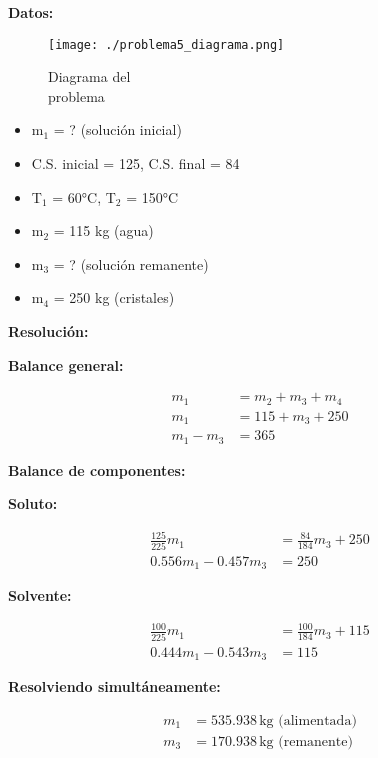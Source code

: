 \documentclass{article} %
\begin{document}
\begin{multicols}{2} %
\noindent\textbf{Datos:} %

\begin{figure}[H]
    \begin{minipage}[t]{0.3\textwidth} %
        \raggedright %
        \texttt{[image: ./problema5\_diagrama.png]} %
        \caption{Diagrama del \\ problema}
    \end{minipage}
\end{figure}

\textbf{} %
\begin{itemize}
\item m$_1$ = ? (solución inicial)
\item C.S. inicial = 125, C.S. final = 84
\item T$_1$ = 60°C, T$_2$ = 150°C
\item m$_2$ = 115 kg (agua)
\item m$_3$ = ? (solución remanente)
\item m$_4$ = 250 kg (cristales)
\end{itemize}

\columnbreak %

\noindent\textbf{Resolución:} %

\textbf{Balance general:}

\begin{align*}
    m_1 &= m_2 + m_3 + m_4 \\[10pt]
    m_1 &= 115 + m_3 + 250 \\[10pt]
    m_1 - m_3 &= 365
\end{align*}

\textbf{Balance de componentes:}

\textbf{Soluto:}

\begin{align*}
    \frac{125}{225} m_1 &= \frac{84}{184} m_3 + 250 \\[10pt]
    0.556 m_1 - 0.457 m_3 &= 250
\end{align*}

\textbf{Solvente:}

\begin{align*}
    \frac{100}{225} m_1 &= \frac{100}{184} m_3 + 115 \\[10pt]
    0.444 m_1 - 0.543 m_3 &= 115
\end{align*}

\textbf{Resolviendo simultáneamente:}

\begin{align*}
    m_1 &= 535.938 \, \text{kg (alimentada)} \\[10pt]
    m_3 &= 170.938 \, \text{kg (remanente)}
\end{align*}
\end{multicols} %
\end{document}

